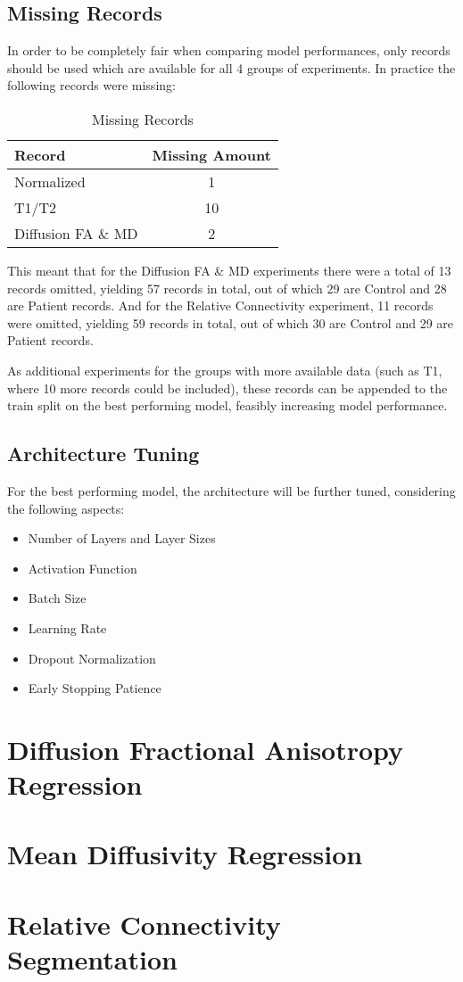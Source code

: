 \subsection{Missing Records}

In order to be completely fair when comparing model performances, only records should be used which are available for all 4 groups of experiments. In practice the following records were missing:
\begin{table}[H]
\centering
\begin{tabular}{|l|c|}
\hline
\textbf{Record} & \textbf{Missing Amount} \\ \hline
Normalized & 1 \\ \hline
T1/T2 & 10 \\ \hline
Diffusion \ac{FA} \& \ac{MD} & 2 \\ \hline
\end{tabular}
\caption{Missing Records}
\end{table}
This meant that for the Diffusion \ac{FA} \& \ac{MD} experiments there were a total of 13 records omitted, yielding 57 records in total, out of which 29 are Control and 28 are Patient records. And for the Relative Connectivity experiment, 11 records were omitted, yielding 59 records in total, out of which 30 are Control and 29 are Patient records.\par
As additional experiments for the groups with more available data (such as T1, where 10 more records could be included), these records can be appended to the train split on the best performing model, feasibly increasing model performance.

\subsection{Architecture Tuning}

For the best performing model, the architecture will be further tuned, considering the following aspects:
\begin{itemize}
  \item Number of Layers and Layer Sizes
  \item Activation Function
  \item Batch Size
  \item Learning Rate
  \item Dropout Normalization
  \item Early Stopping Patience
\end{itemize}

\section{Diffusion Fractional Anisotropy Regression}



\section{Mean Diffusivity Regression}



\section{Relative Connectivity Segmentation}











